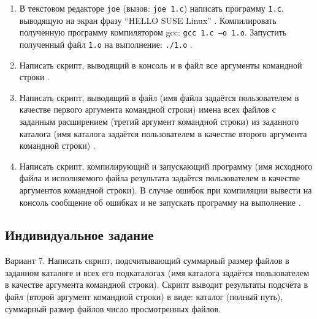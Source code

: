 \begin{enumerate}[listparindent=\fivecharsapprox]
	\item В текстовом редакторе \lstinline{joe} (вызов: \lstinline{joe 1.c}) написать программу \lstinline{1.c}, выводящую на экран фразу “HELLO SUSE Linux” . Компилировать полученную программу компилятором gcc: \lstinline{gcc 1.c –o 1.o}. Запустить полученный файл \lstinline{1.o} на выполнение: \lstinline{./1.o} .
		


	\item Написать скрипт, выводящий в консоль и в файл все аргументы командной строки .


	\item Написать скрипт, выводящий в файл (имя файла задаётся пользователем в качестве первого аргумента командной строки) имена всех файлов с заданным расширением (третий аргумент командной строки) из заданного каталога (имя каталога задаётся пользователем в качестве второго аргумента командной строки) .


	\item Написать скрипт, компилирующий и запускающий программу (имя исходного файла и исполняемого файла результата задаётся пользователем в качестве аргументов командной строки).
В случае ошибок при компиляции вывести на консоль сообщение об ошибках и не запускать программу на выполнение .


\end{enumerate}

\subsection{Индивидуальное задание}
\label{sec:job:personal_task}

Вариант 7. Написать скрипт, подсчитывающий суммарный размер файлов в заданном
каталоге и всех его подкаталогах (имя каталога задаётся пользователем в
качестве аргумента командной строки). Скрипт выводит результаты подсчёта
в файл (второй аргумент командной строки) в виде: каталог (полный путь),
суммарный размер файлов число просмотренных файлов.

